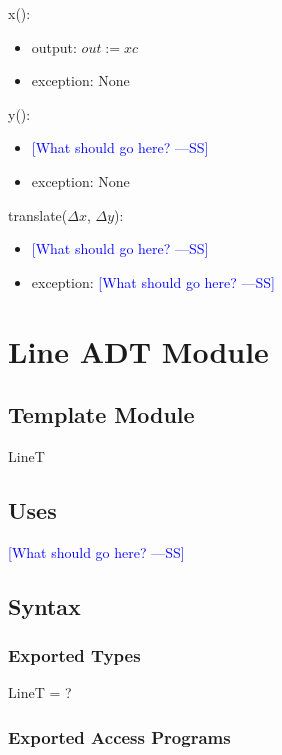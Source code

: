 \documentclass[12pt]{article}
\newcommand{\authornote}[3]{\textcolor{#1}{[#3 ---#2]}}
\newcommand{\authornote}[3]{}
\newcommand{\wss}[1]{\authornote{blue}{SS}{#1}}
\begin{document}
\noindent x():
\begin{itemize}
\item output: $out := xc$
\item exception: None
\end{itemize}

\noindent y():
\begin{itemize}
\item \wss{What should go here?}
\item exception: None
\end{itemize}

\noindent translate($\Delta x$, $\Delta y$):
\begin{itemize}
\item \wss{What should go here?}
\item exception: \wss{What should go here?}
\end{itemize}

\newpage

\section* {Line ADT Module}

\subsection*{Template Module}

LineT

\subsection* {Uses}

\wss{What should go here?}

\subsection* {Syntax}

\subsubsection* {Exported Types}

LineT = ?

\subsubsection* {Exported Access Programs}
\end{document}
